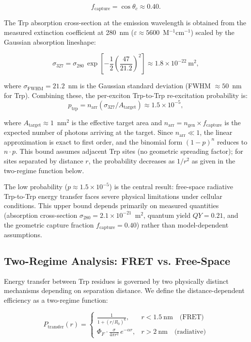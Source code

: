 \documentclass[aps,pre,twocolumn,showpacs,superscriptaddress]{revtex4-2}
\begin{document}
\[
f_{\mathrm{capture}} = \cos\theta_c \approx 0.40.
\]

The Trp absorption cross-section at the emission wavelength is obtained from the measured extinction coefficient at 280~nm ($\varepsilon \approx 5600$~M$^{-1}$cm$^{-1}$) scaled by the Gaussian absorption lineshape:

\[
\sigma_{327} = \sigma_{280} \,
\exp\!\left[-\frac{1}{2}\left(\frac{47}{21.2}\right)^2\right] 
\approx 1.8\times10^{-22}~\mathrm{m}^2,
\]

where $\sigma_{\mathrm{FWHM}} = 21.2$~nm is the Gaussian standard deviation (FWHM $\approx 50$~nm for Trp). Combining these, the per-exciton Trp-to-Trp re-excitation probability is:
\begin{equation}
p_{\mathrm{trp}} = n_{\mathrm{arr}} (\sigma_{327}/A_{\mathrm{target}}) \approx 1.5\times10^{-5},
\label{eq:ptrp}
\end{equation}

where $A_{\mathrm{target}} \approx 1$~nm$^2$ is the effective target area and $n_{\mathrm{arr}} = n_{\mathrm{gen}} \times f_{\mathrm{capture}}$ is the expected number of photons arriving at the target. Since $n_{\mathrm{arr}} \ll 1$, the linear approximation is exact to first order, and the binomial form $(1-p)^n$ reduces to $n \cdot p$. This bound assumes adjacent Trp sites (no geometric spreading factor); for sites separated by distance $r$, the probability decreases as $1/r^2$ as given in the two-regime function below.

The low probability ($p \approx 1.5\times10^{-5}$) is the central result: free-space radiative Trp-to-Trp energy transfer faces severe physical limitations under cellular conditions. This upper bound depends primarily on measured quantities (absorption cross-section $\sigma_{280} = 2.1\times10^{-21}$~m$^2$, quantum yield $QY = 0.21$\cite{Babcock2024}, and the geometric capture fraction $f_{\mathrm{capture}} = 0.40$) rather than model-dependent assumptions.

\subsection{Two-Regime Analysis: FRET vs. Free-Space}

Energy transfer between Trp residues is governed by two physically distinct mechanisms depending on separation distance. We define the distance-dependent efficiency as a two-regime function:

\[
P_{\mathrm{transfer}}(r) = 
\begin{cases}
\displaystyle\frac{1}{1 + (r/R_0)^6}, & r < 1.5~\mathrm{nm} \quad \text{(FRET)} \\[8pt]
\displaystyle\Phi_F \cdot \frac{\sigma}{4\pi r^2} \, e^{-\alpha r}, & r > 2~\mathrm{nm} \quad \text{(radiative)}
\end{cases}
\]
\end{document}
